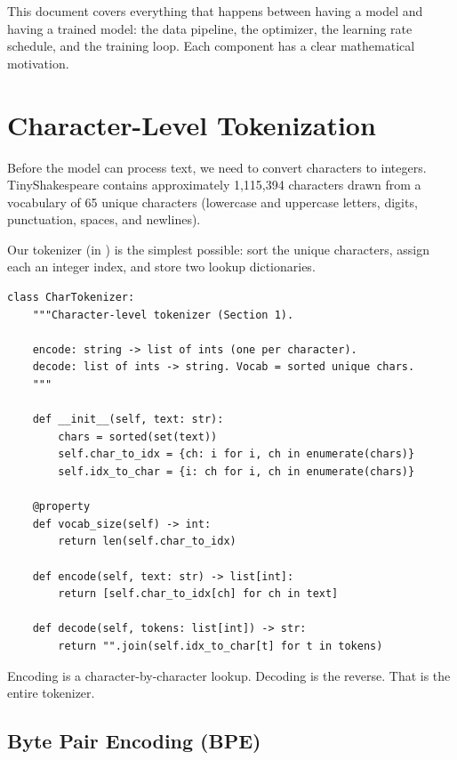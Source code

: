 


This document covers everything that happens between having a model and having a trained model: the data pipeline, the optimizer, the learning rate schedule, and the training loop. Each component has a clear mathematical motivation.

\section{Character-Level Tokenization}

Before the model can process text, we need to convert characters to integers. TinyShakespeare contains approximately 1,115,394 characters drawn from a vocabulary of 65 unique characters (lowercase and uppercase letters, digits, punctuation, spaces, and newlines).

Our tokenizer (in ) is the simplest possible: sort the unique characters, assign each an integer index, and store two lookup dictionaries.

\begin{lstlisting}
class CharTokenizer:
    """Character-level tokenizer (Section 1).

    encode: string -> list of ints (one per character).
    decode: list of ints -> string. Vocab = sorted unique chars.
    """

    def __init__(self, text: str):
        chars = sorted(set(text))
        self.char_to_idx = {ch: i for i, ch in enumerate(chars)}
        self.idx_to_char = {i: ch for i, ch in enumerate(chars)}

    @property
    def vocab_size(self) -> int:
        return len(self.char_to_idx)

    def encode(self, text: str) -> list[int]:
        return [self.char_to_idx[ch] for ch in text]

    def decode(self, tokens: list[int]) -> str:
        return "".join(self.idx_to_char[t] for t in tokens)
\end{lstlisting}

Encoding is a character-by-character lookup. Decoding is the reverse. That is the entire tokenizer.

\subsection{Byte Pair Encoding (BPE)}

